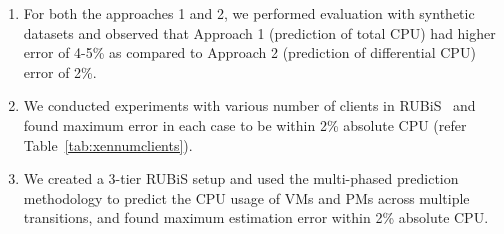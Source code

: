 \begin{enumerate}
\singlespacing
	\item For both the approaches 1 and 2, we performed evaluation
with synthetic datasets and observed that Approach 1 (prediction 
of total CPU) had higher error of 4-5\% as compared to 
Approach 2 (prediction of differential CPU) error of 2\%.
	\item We conducted experiments with various number of clients
in RUBiS~\cite{rubis} and found maximum error
in each case to be within 2\% absolute CPU (refer Table~\ref{tab:xennumclients}). 
	\item We created a 3-tier RUBiS setup and used the multi-phased
prediction methodology to predict the CPU usage of VMs and PMs 
across multiple transitions, and found maximum estimation error
within 2\% absolute CPU.
\end{enumerate}


